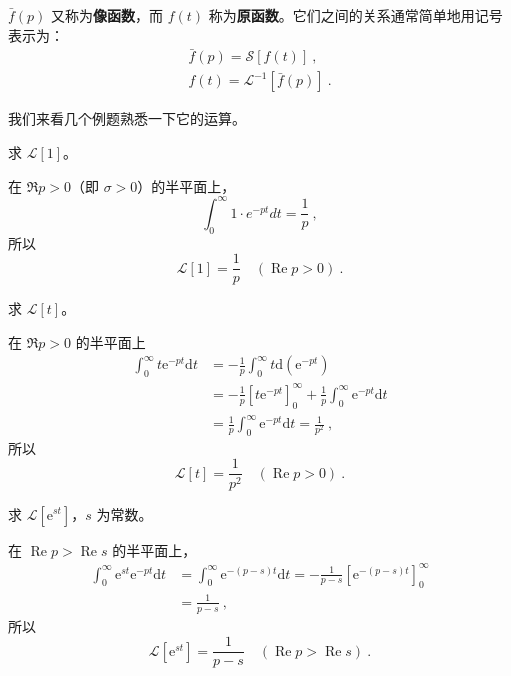 $\bar f(p)$ 又称为\textbf{像函数}，而 $f(t)$ 称为\textbf{原函数}。它们之间的关系通常简单地用记号表示为：
\begin{equation}
\begin{array}{l}\bar{f}(p)=\mathscr{S}[f(t)] ~,\\ f(t)=\mathscr{L}^{-1}[\bar{f}(p)]~.\end{array}
\end{equation}

我们来看几个例题熟悉一下它的运算。

\begin{example}{}
求 $\mathscr L[1]$。

在 $\Re p>0$（即 $\sigma>0$）的半平面上，
\begin{equation}
\int_{0}^{\infty} 1 \cdot e^{-p t} d t=\frac{1}{p}~,
\end{equation}
所以
\begin{equation}
\mathscr{L}[1]=\frac{1}{p} \quad(\operatorname{Re} p>0)~.
\end{equation}
\end{example}

\begin{example}{}
求 $\mathscr L[t]$。

在 $\Re p>0$ 的半平面上
\begin{equation}
\begin{aligned} \int_{0}^{\infty} t \mathrm{e}^{-p t} \mathrm{d} t &=-\frac{1}{p} \int_{0}^{\infty} t \mathrm{d}\left(\mathrm{e}^{-p t}\right) \\ &=-\frac{1}{p}\left[t \mathrm{e}^{-p t}\right]_{0}^{\infty}+\frac{1}{p} \int_{0}^{\infty} \mathrm{e}^{-p t} \mathrm{d} t \\ &=\frac{1}{p} \int_{0}^{\infty} \mathrm{e}^{-p t} \mathrm{d} t=\frac{1}{p^{2}} ~,\end{aligned}
\end{equation}
所以
\begin{equation}
\mathscr{L}[t]=\frac{1}{p^{2}} \quad(\operatorname{Re} p>0)~.
\end{equation}
\end{example}

\begin{example}{}
求 $\mathscr L[\mathrm e^{st}]$，$s$ 为常数。

在 $\operatorname{Re} p>\operatorname{Re} s$ 的半平面上，
\begin{equation}
\begin{aligned} \int_{0}^{\infty} \mathrm{e}^{s t} \mathrm{e}^{-p t} \mathrm{d} t 
&=\int_{0}^{\infty} \mathrm{e}^{-(p-s) t} \mathrm{d} t=-\frac{1}{p-s}\left[\mathrm{e}^{-(p-s) t}\right]_{0}^{\infty} \\ 
&=\frac{1}{p-s}~, \end{aligned}
\end{equation}
所以
\begin{equation}
\mathscr{L}\left[\mathrm{e}^{st}\right]=\frac{1}{p-s} \quad(\operatorname{Re} p>\operatorname{Re} s)~.
\end{equation}
\end{example}

